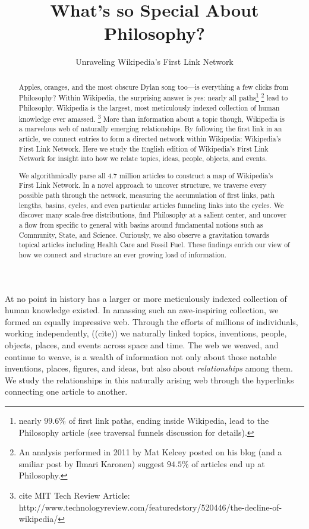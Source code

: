 \documentclass[twoside]{article}
\title{\vspace{-5mm}%
	\fontsize{24pt}{12pt}\selectfont
	\textbf{What's so Special About Philosophy?} 
	}
\author{%
\fontsize{14pt}{14pt}\selectfont
	Unraveling Wikipedia's First Link Network \vspace{-2mm}\\
	}
\date{}
\begin{document}
\maketitle
\thispagestyle{fancy}

\begin{abstract}
\fontsize{12pt}{12pt}
\selectfont

Apples, oranges, and the most obscure Dylan song too---is everything a few clicks from Philosophy? 
Within Wikipedia, the surprising answer is yes: nearly all 
paths\footnote{
nearly $99.6\%$ of first link paths, ending inside Wikipedia, lead to the Philosophy article (see traversal funnels discussion for details).}
\footnote{
An analysis performed in 2011 by Mat Kelcey posted on his blog (and a smiliar post by Ilmari Karonen) suggest $94.5\%$ of articles end up at Philosophy.
}
lead to Philosophy.
Wikipedia is the largest, most meticulously indexed collection of human knowledge ever amassed. 
\footnote{
cite MIT Tech Review Article: http://www.technologyreview.com/featuredstory/520446/the-decline-of-wikipedia/
}
More than information about a topic though, Wikipedia is a marvelous web of naturally emerging relationships.  
By following the first link in an article, we connect entries to form a directed network within Wikipedia: Wikipedia's First Link Network. 
Here we study the English edition of Wikipedia's First Link Network for insight into how we relate topics, ideas, people, objects, and events.  


We algorithmically parse all 4.7 million articles to construct a map of Wikipedia's First Link Network. 
In a novel approach to uncover structure, we traverse every possible path through the network, 
measuring the accumulation of first links, path lengths, basins, cycles, and even particular articles funneling links into the cycles.
We discover many scale-free distributions, find Philosophy at a salient center, and uncover a flow from specific to general with 
basins around fundamental notions such as Community, State, and Science. 
Curiously, we also observe a gravitation towards topical articles including Health Care and Fossil Fuel.
These findings enrich our view of how we connect and structure
an ever growing load of information.

\end{abstract}

\fontsize{11pt}{11pt}
\selectfont

At no point in history has a larger or more meticulously indexed collection of human knowledge existed.
In amassing such an awe-inspiring collection, we formed an equally impressive web. 
Through the efforts of millions of individuals, working independently,
((cite))
we naturally linked topics, inventions, people, objects, places, and events across space and time.
The web we weaved, and continue to weave, is a wealth of information not only about those notable inventions, 
places, figures, and ideas, but also about \textit{relationships} among them.
We study the relationships in this naturally arising web through the hyperlinks connecting one article to another.
\end{document}
